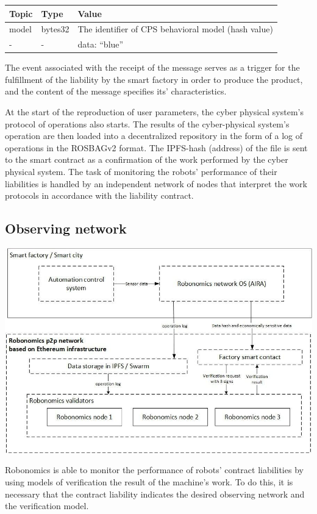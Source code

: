 \documentclass{article}
\begin{document}
\begin{tabular}{ |l |l |l }
 \textbf{Topic} & \textbf{Type} & \textbf{Value} \\ 
 \hline
 model & bytes32 & The identifier of CPS behavioral model (hash value) \\ 
 - &  - & data: “blue” \\ 
\end{tabular}

The event associated with the receipt of the message serves as a trigger for the fulfillment of the liability by the smart factory in order to produce the product, and the content of the message specifies its’ characteristics.

At the start of the reproduction of user parameters, the cyber physical system’s protocol of operations also starts. The results of the cyber-physical system’s operation are then loaded into a decentralized repository in the form of a log of operations in the ROSBAGv2 format. The IPFS-hash (address) of the file is sent to the smart contract as a confirmation of the work performed by the cyber physical system. The task of monitoring the robots’ performance of their liabilities is handled by an independent network of nodes that interpret the work protocols in accordance with the liability contract.

\subsection{Observing network}

\includegraphics[width=1\textwidth]{app-3.png} 

Robonomics is able to monitor the performance of robots’ contract liabilities by using models of verification the result of the machine’s work. To do this, it is necessary that the contract liability indicates the desired observing network and the verification model.
\end{document}
